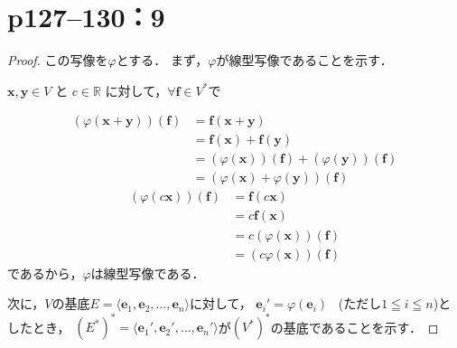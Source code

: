 \documentclass[a4paper,10pt,fleqn]{ltjsarticle}
\begin{document}
\newpage

\section*{p127--130：9}
\begin{tleftbar}
  \begin{proof}
    この写像を$\varphi$とする．
    まず，$\varphi$が線型写像であることを示す．

    $\bm{x} , \bm{y} \in V$ と $c \in \mathbb{R}$ に対して，$ \forall \bm{f} \in V^\ast$で

    \begin{align*}
      ( \varphi(\bm{x}+\bm{y})) (\bm{f}) & = \bm{f} (\bm{x}+\bm{y})                                  \\
                                         & =\bm{f} (\bm{x}) + \bm{f} (\bm{y})                        \\
                                         & = (\varphi(\bm{x})) (\bm{f}) + (\varphi(\bm{y})) (\bm{f}) \\
                                         & = ( \varphi(\bm{x}) + \varphi(\bm{y})) (\bm{f})
    \end{align*}
    \begin{align*}
      ( \varphi(c \bm{x})) (\bm{f}) & = \bm{f} (c \bm{x})            \\
                                    & = c \bm{f} (\bm{x})            \\
                                    & = c (\varphi(\bm{x})) (\bm{f}) \\
                                    & = (c \varphi(\bm{x})) (\bm{f})
    \end{align*}
    であるから，$\varphi$は線型写像である．

    次に，$V$の基底$E= \langle \bm{e}_1 , \bm{e}_2, \dots , \bm{e}_n \rangle$に対して，
    $\bm{e}_i ' = \varphi ( \bm{e}_i)$ ~(ただし$1 \leqq i \leqq n$)としたとき，
    $(E^\ast )^\ast= \langle \bm{e}_1 ' , \bm{e}_2 ' , \dots , \bm{e}_n ' \rangle$が$(V^\ast)^\ast$の基底であることを示す．


\end{proof}
\end{tleftbar}
\end{document}

